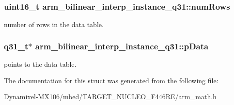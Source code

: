 \subsubsection[{\texorpdfstring{num\+Rows}{numRows}}]{\setlength{\rightskip}{0pt plus 5cm}uint16\+\_\+t arm\+\_\+bilinear\+\_\+interp\+\_\+instance\+\_\+q31\+::num\+Rows}\hypertarget{structarm__bilinear__interp__instance__q31_a2082e3eac56354d75291f03e96ce4aa5}{}\label{structarm__bilinear__interp__instance__q31_a2082e3eac56354d75291f03e96ce4aa5}
number of rows in the data table. 
\subsubsection[{\texorpdfstring{p\+Data}{pData}}]{\setlength{\rightskip}{0pt plus 5cm}q31\+\_\+t$\ast$ arm\+\_\+bilinear\+\_\+interp\+\_\+instance\+\_\+q31\+::p\+Data}\hypertarget{structarm__bilinear__interp__instance__q31_a843eae0c9db5f815e77e1aaf9afea358}{}\label{structarm__bilinear__interp__instance__q31_a843eae0c9db5f815e77e1aaf9afea358}
points to the data table. 

The documentation for this struct was generated from the following file\+:\begin{DoxyCompactItemize}
\item 
Dynamixel-\/\+M\+X106/mbed/\+T\+A\+R\+G\+E\+T\+\_\+\+N\+U\+C\+L\+E\+O\+\_\+\+F446\+R\+E/arm\+\_\+math.\+h\end{DoxyCompactItemize}
